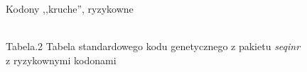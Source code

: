 \documentclass[compress,clock,xcolor=dvipsnames,hyperref={pdfpagelabels=false},final]{beamer}
\begin{document}
\begin{frame}{Kodony ,,kruche'', ryzykowne}
\begin{center}
\\
\small{Tabela.2 Tabela standardowego kodu genetycznego z pakietu {\it seqinr} \\z ryzykownymi kodonami}
\end{center}
\end{frame}
\end{document}
